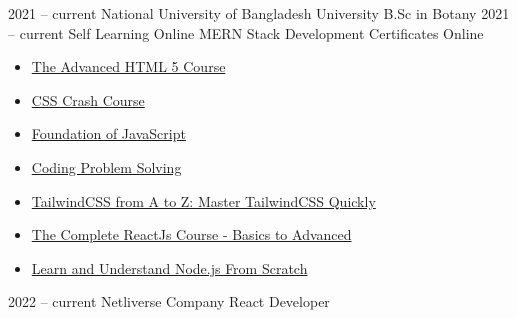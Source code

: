 \documentclass[9pt]{developercv} %
\begin{document}
\vspace{-10 pt}
\begin{entrylist}
    \entry
        {2021 -- current}
		{National University of Bangladesh}
		{University}
		{B.Sc in Botany}
    \entry
        {2021 -- current}
		{Self Learning}
		{Online}
		{MERN Stack Development}
	\entry 
         {}
		{Certificates}
		{Online}
  {\vspace{-10pt}
        \begin{itemize}[noitemsep,topsep=0pt,parsep=0pt,partopsep=0pt, leftmargin=-1pt]
            \item \href{https://ude.my/UC-17764204-0d20-48fc-a46a-bbba47b4e10a}{The Advanced HTML 5 Course}
            \item \href{https://ude.my/UC-03bcb081-37b0-4c87-b6ae-82da4df7f7e4}{CSS Crash Course}
            \item \href{https://drive.google.com/file/d/1MFcHnKhldKNf6xX_na6Q9pwkalTVlwre/view?usp=drivesdk}{Foundation of JavaScript}
            \item \href{https://drive.google.com/file/d/1M6jaFO06xIweORPI9UW7wM7kpJ8IixlH/view?usp=drivesdk}{Coding Problem Solving}
            \item \href{https://www.udemy.com/certificate/UC-7f7a3348-96c3-4b3e-b943-76d2eda0b4d7/}{TailwindCSS from A to Z: Master TailwindCSS Quickly}
            \item \href{https://ude.my/UC-4b22e9f6-13d0-4290-bbff-7f47bc2896ca}{The Complete ReactJs Course - Basics to Advanced}
           \item \href{https://ude.my/UC-89532c78-1057-4eb8-b166-fa3118b93bd6}{Learn and Understand Node.js From Scratch}
       \end{itemize}}
\end{entrylist}

\vspace{-10 pt}
\begin{entrylist}
	\entry
        {2022 --  current}
		{Netliverse}
		{Company}
		{React Developer}
\end{entrylist}
\end{document}
